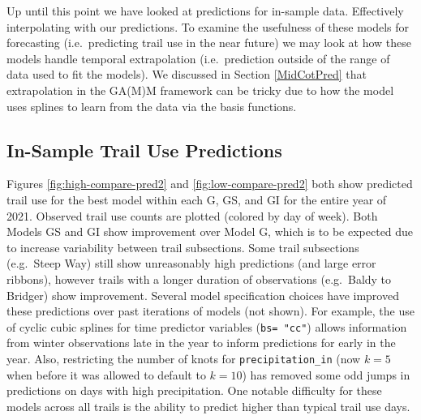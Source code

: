 \documentclass[
]{book}
\begin{document}
Up until this point we have looked at predictions for in-sample data. Effectively interpolating with our predictions. To examine the usefulness of these models for forecasting (i.e.~predicting trail use in the near future) we may look at how these models handle temporal extrapolation (i.e.~prediction outside of the range of data used to fit the models). We discussed in Section \ref{MidCotPred} that extrapolation in the GA(M)M framework can be tricky due to how the model uses splines to learn from the data via the basis functions.

\hypertarget{in-sample-trail-use-predictions}{%
\subsection{In-Sample Trail Use Predictions}\label{in-sample-trail-use-predictions}}

Figures \ref{fig:high-compare-pred2} and \ref{fig:low-compare-pred2} both show predicted trail use for the best model within each G, GS, and GI for the entire year of 2021. Observed trail use counts are plotted (colored by day of week). Both Models GS and GI show improvement over Model G, which is to be expected due to increase variability between trail subsections. Some trail subsections (e.g.~Steep Way) still show unreasonably high predictions (and large error ribbons), however trails with a longer duration of observations (e.g.~Baldy to Bridger) show improvement. Several model specification choices have improved these predictions over past iterations of models (not shown). For example, the use of cyclic cubic splines for time predictor variables (\texttt{bs=\ "cc"}) allows information from winter observations late in the year to inform predictions for early in the year. Also, restricting the number of knots for \texttt{precipitation\_in} (now \(k=5\) when before it was allowed to default to \(k=10\)) has removed some odd jumps in predictions on days with high precipitation. One notable difficulty for these models across all trails is the ability to predict higher than typical trail use days.
\end{document}
